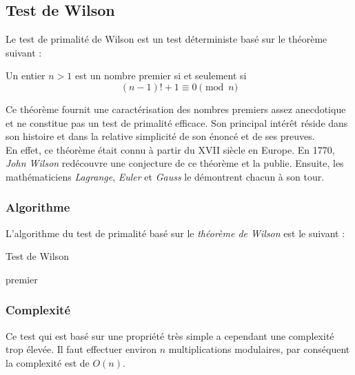 \subsection{Test de Wilson}
	Le test de primalité de Wilson est un test déterministe basé sur le théorème suivant :
		
		\vspace{-1.5em}\begin{adjustwidth}{1.5cm}{1.5cm} 
		\begin{Th}
			Un entier $n > 1$ est un nombre premier si et seulement si
			\[(n-1)! + 1 \equiv 0 \pmod n\]
		\end{Th}
		\end{adjustwidth}\vspace{0.5em}
		
	Ce théorème fournit une caractérisation des nombres premiers assez anecdotique et ne constitue pas un test de primalité efficace. Son principal intérêt réside dans son histoire et dans la relative simplicité de son énoncé et de ses preuves.\\
	\indent En effet, ce théorème était connu à partir du XVII siècle en Europe. En 1770, \textit{John Wilson} redécouvre une conjecture de ce théorème et la publie. Ensuite, les mathématiciens \textit{Lagrange}, \textit{Euler} et \textit{Gauss} le démontrent chacun à son tour. 
		
	\subsubsection*{Algorithme}
		L'algorithme du test de primalité basé sur le \textit{théorème de Wilson} est le suivant :\\
		
		\begin{algorithm}[H]
			\caption{Test de Wilson}\label{Wil}
			 { 
				{\Retour premier\;}
			} 
		\end{algorithm}	
		
	\subsubsection*{Complexité}
		Ce test qui est basé sur une propriété très simple a cependant une complexité trop élevée. Il faut effectuer environ $n$ multiplications modulaires, par conséquent la complexité est de $O(n)$.
